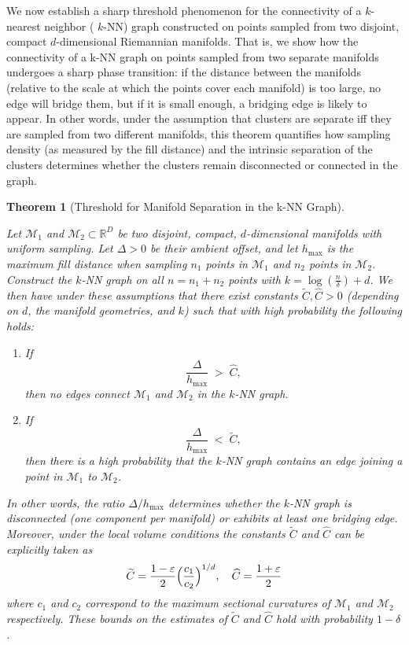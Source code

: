 \documentclass{article}
\theoremstyle{plain}
\newtheorem{theorem}{Theorem}[section]
\theoremstyle{definition}
\theoremstyle{remark}
\begin{document}
We now establish a sharp threshold phenomenon for the connectivity of a \(k\)-nearest neighbor ( \(k\)-NN) graph constructed on points sampled from two disjoint, compact \(d\)-dimensional Riemannian manifolds. That is, we show how the connectivity of a k-NN graph on points sampled from two separate manifolds undergoes a sharp phase transition: if the distance between the manifolds (relative to the scale at which the points cover each manifold) is too large, no edge will bridge them, but if it is small enough, a bridging edge is likely to appear. In other words, under the assumption that clusters are separate iff they are sampled from two different manifolds, this theorem quantifies how sampling density (as measured by the fill distance) and the intrinsic separation of the clusters determines whether the clusters remain disconnected or connected in the graph.


\begin{theorem}[Threshold for Manifold Separation in the k-NN Graph]
\label{thm:knn-threshold}

Let $\mathcal{M}_1$ and $\mathcal{M}_2\subset\mathbb{R}^D$ be two disjoint, compact, $d$-dimensional manifolds with uniform sampling. Let $\Delta>0$ be their ambient offset, and let $h_{\max}$ is the maximum fill distance when sampling $n_1$ points in $\mathcal{M}_1$ and $n_2$ points in $\mathcal{M}_2$. Construct the $k$-NN graph on all $n=n_1+n_2$ points with $k = \log(\frac{n}{\delta}) + d$. We then have under these assumptions that there exist constants $\widetilde{C},\widehat{C}>0$ (depending on $d$, the manifold geometries, and $k$) such that with high probability the following holds:
\begin{enumerate}
    \item If 
    \[
    \frac{\Delta}{h_{\max}} \;>\; \widehat{C},
    \]
    then no edges connect $\mathcal{M}_1$ and $\mathcal{M}_2$ in the $k$-NN graph.
    \item If 
    \[
    \frac{\Delta}{h_{\max}} \;<\; \widetilde{C},
    \]
    then there is a high probability that the $k$-NN graph contains an edge joining a point in $\mathcal{M}_1$ to $\mathcal{M}_2$.
\end{enumerate}
In other words, the ratio $\Delta/h_{\max}$ determines whether the $k$-NN graph is disconnected (one component per manifold) or exhibits at least one bridging edge. Moreover, under the local volume conditions the constants $\widetilde{C}$ and $\widehat{C}$ can be explicitly taken as
\[
\widetilde{C} = \frac{1-\varepsilon}{2}\Bigl(\frac{c_1}{c_2}\Bigr)^{1/d},\quad
\widehat{C} = \frac{1+\varepsilon}{2}
\]
where $c_1$ and $c_2$ correspond to the maximum sectional curvatures of $\mathcal{M}_1$ and $\mathcal{M}_2$ respectively. These bounds on the estimates of $\widetilde{C}$ and $\widehat{C}$ hold with probability $1 - \delta$.
\end{theorem}
\end{document}
